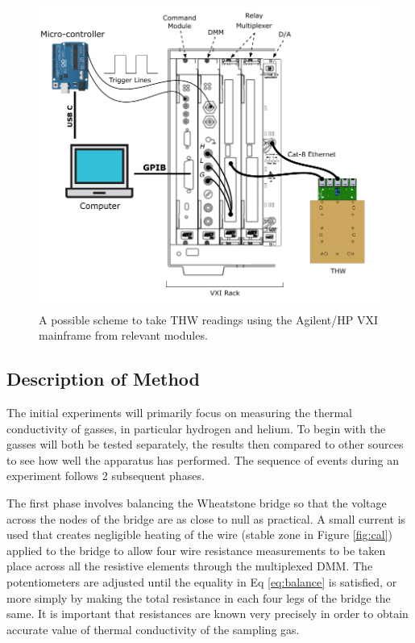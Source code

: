 \documentclass[12pt,MEng]{UoAThesis}
\begin{document}
\begin{figure}[htp]
  \centering
  \includegraphics[clip,width=1\linewidth]{figures/VXI.pdf}
  \caption{\label{fig:VXI} A possible scheme to take THW readings using the Agilent/HP VXI mainframe from relevant modules.}
\end{figure}

\subsection{Description of Method}

The initial experiments will primarily focus on measuring the thermal conductivity of gasses, in particular hydrogen and helium. To begin with the gasses will both be tested separately, the results then compared to other sources to see how well the apparatus has performed. The sequence of events during an experiment follows 2 subsequent phases. 

The first phase involves balancing the Wheatstone bridge so that the voltage across the nodes of the bridge are as close to null as practical. A small current is used that creates negligible heating of the wire (stable zone in Figure \ref{fig:cal}) applied to the bridge to allow four wire resistance measurements to be taken place across all the resistive elements through the multiplexed DMM. The potentiometers are adjusted until the equality in Eq \ref{eq:balance} is satisfied, or more simply by making the total resistance in each four legs of the bridge the same. It is important that resistances are known very precisely in order to obtain accurate value of thermal conductivity of the sampling gas.
\end{document}
